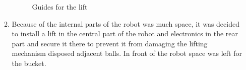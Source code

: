 \begin{enumerate}
\begin{enumerate}
\begin{figure}[H]
\begin{minipage}[h]{0.31\linewidth}
      	\end{minipage}
      	\caption{Guides for the lift}
      \end{figure}
      
      \item Because of the internal parts of the robot was much space, it was decided to install a lift in the central part of the robot and electronics in the rear part and secure it there to prevent it from damaging the lifting mechanism disposed adjacent balls. In front of the robot space was left for the bucket. 
       

\end{enumerate}
\end{enumerate}
